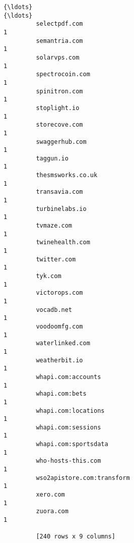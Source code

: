 \documentclass[11pt]{article}
\begin{document}
\begin{Verbatim}[commandchars=\\\{\}]
         {\ldots}                                                                {\ldots}  
         selectpdf.com                                                        1  
         semantria.com                                                        1  
         solarvps.com                                                         1  
         spectrocoin.com                                                      1  
         spinitron.com                                                        1  
         stoplight.io                                                         1  
         storecove.com                                                        1  
         swaggerhub.com                                                       1  
         taggun.io                                                            1  
         thesmsworks.co.uk                                                    1  
         transavia.com                                                        1  
         turbinelabs.io                                                       1  
         tvmaze.com                                                           1  
         twinehealth.com                                                      1  
         twitter.com                                                          1  
         tyk.com                                                              1  
         victorops.com                                                        1  
         vocadb.net                                                           1  
         voodoomfg.com                                                        1  
         waterlinked.com                                                      1  
         weatherbit.io                                                        1  
         whapi.com:accounts                                                   1  
         whapi.com:bets                                                       1  
         whapi.com:locations                                                  1  
         whapi.com:sessions                                                   1  
         whapi.com:sportsdata                                                 1  
         who-hosts-this.com                                                   1  
         wso2apistore.com:transform                                           1  
         xero.com                                                             1  
         zuora.com                                                            1  
         
         [240 rows x 9 columns]
\end{Verbatim}
            
\end{document}
